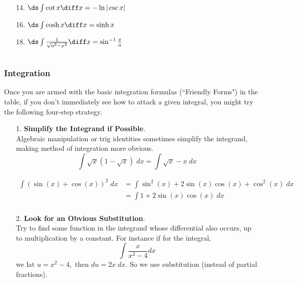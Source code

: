 \begin{frame}
\begin{columns}
\begin{column}{0.5\textwidth}
\begin{enumerate}
\item[14.]$ \ds \int \cot x \diff x = -\ln |\csc x|  $

\item[16.]$ \ds \int \cosh x \diff x = \sinh x $

\item[18.]$ \ds \int \frac{1}{\sqrt{a^2-x^2}} \diff x = \sin^{-1} \frac{x}{a} $

\end{enumerate}
\end{column}

\end{columns}



\end{frame}


\begin{frame}
\frametitle{Integration}
Once you are armed with the  basic integration formulas (``Friendly Forms") in the table, if you don't immediately see
how to attack a given integral, you might try the following four-step strategy. \pause 
\begin{enumerate}
\item[1.] \textbf{Simplify the Integrand  if Possible}.\\
 Algebraic manipulation or trig identities sometimes simplify the integrand, making method of
integration more obvious. \\ \pause 
\[
\int \sqrt{x}(1-\sqrt{x})\; dx = \int \sqrt{x}-x\; dx
\]
\pause 

\begin{align*}
\int (\sin(x)+\cos(x))^2\; dx & = \int \sin^2(x)+2\sin(x)\cos(x)+\cos^2(x)\; dx\\
& = \int 1+2\sin(x)\cos(x)\; dx
\end{align*} 


\end{enumerate}

\end{frame}

\begin{frame}
\frametitle{}

\begin{enumerate}
\item[2.] \textbf{Look for an Obvious Substitution}.\\
 Try to find some function in the integrand whose differential also occurs, up to multiplication by a constant. \pause 
For instance if for the integral, 
\[
\int \frac{x}{x^2-4} dx
\]
 we lat $ u=x^2-4, $ then $ du= 2x\; dx $. So we use substitution (instead of partial fractions).
 \end{enumerate} 
 \end{frame}
 
